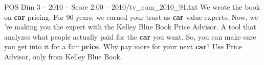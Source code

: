 \begin{textsample}{POS Dim 3 – 2010 – Score 2.00 – 2010/tv\_com\_2010\_91.txt}  \label{ex:f3_pos_044}
We wrote the book on \textbf{car} pricing.
For 90 years, we earned your trust as \textbf{car} value experts.
Now, we 're making you the expert with the Kelley Blue Book Price Advisor.
A tool that analyzes what people actually paid for the \textbf{car} you want.
So, you can make sure you get into it for a fair \textbf{price}.
Why pay more for your next \textbf{car}?
Use Price Advisor, only from Kelley Blue Book.

\end{textsample}
